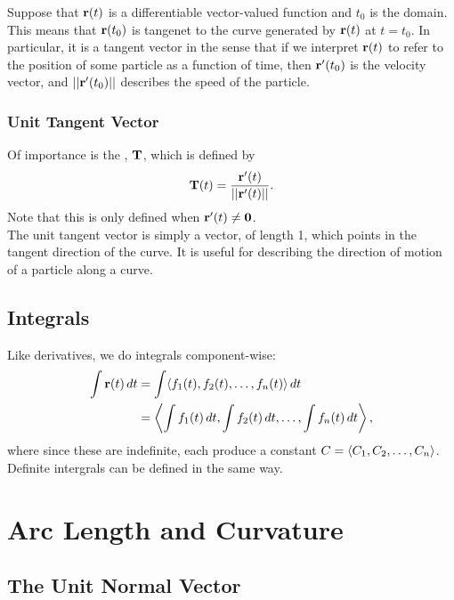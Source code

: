 Suppose that \(\mathbf{r}(t)\) is a differentiable vector-valued function and \(t_{0}\) is the domain. This means that \(\mathbf{r}(t_{0})\) is tangenet to the curve generated by \(\mathbf{r}(t)\) at \(t = t_{0}\). In particular, it is a tangent vector in the sense that if we interpret \(\mathbf{r}(t)\) to refer to the position of some particle as a function of time, then \(\mathbf{r}'(t_{0})\) is the velocity vector, and \(||\mathbf{r}'(t_{0})||\) describes the speed of the particle.

\subsubsection{Unit Tangent Vector}

Of importance is the , \(\mathbf{T}\), which is defined by
\[
    \mathbf{T}(t) = \frac{\mathbf{r}'(t)}{||\mathbf{r}'(t)||}.
\]
Note that this is only defined when \(\mathbf{r}'(t) \ne \mathbf{0}\). \\

The unit tangent vector is simply a vector, of length 1, which points in the tangent direction of the curve. It is useful for describing the direction of motion of a particle along a curve.

\subsection{Integrals}

Like derivatives, we do integrals component-wise:
\begin{align*}
    \int \mathbf{r}(t) \, dt &= \int \langle f_{1}(t),f_{2}(t),\ldots,f_{n}(t) \rangle \, dt \\
    &= \left\langle \int f_{1}(t) \, dt, \int f_{2}(t) \, dt, \ldots, \int f_{n}(t) \, dt \right\rangle,
\end{align*}
where since these are indefinite, each produce a constant \(C = \left\langle C_{1},C_{2},\ldots,C_{n} \right\rangle\). Definite intergrals can be defined in the same way.





\newpage

\section{Arc Length and Curvature}

\subsection{The Unit Normal Vector}

